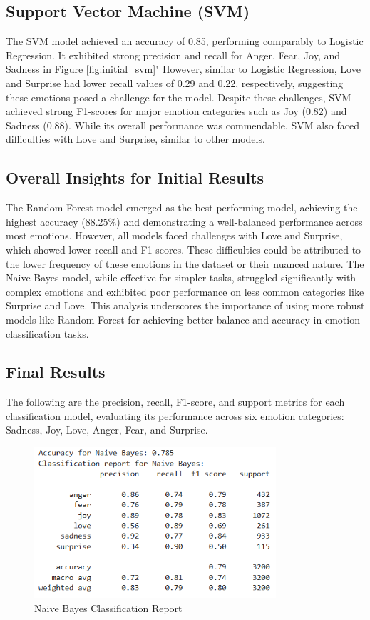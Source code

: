\subsection{Support Vector Machine (SVM)}
The SVM model achieved an accuracy of 0.85, performing comparably to Logistic Regression. It exhibited strong precision and recall for Anger, Fear, Joy, and Sadness in Figure \ref{fig:initial_svm}" However, similar to Logistic Regression, Love and Surprise had lower recall values of 0.29 and 0.22, respectively, suggesting these emotions posed a challenge for the model. Despite these challenges, SVM achieved strong F1-scores for major emotion categories such as Joy (0.82) and Sadness (0.88). While its overall performance was commendable, SVM also faced difficulties with Love and Surprise, similar to other models.

\subsection{Overall Insights for Initial Results}
The Random Forest model emerged as the best-performing model, achieving the highest accuracy (88.25\%) and demonstrating a well-balanced performance across most emotions. However, all models faced challenges with Love and Surprise, which showed lower recall and F1-scores. These difficulties could be attributed to the lower frequency of these emotions in the dataset or their nuanced nature. The Naive Bayes model, while effective for simpler tasks, struggled significantly with complex emotions and exhibited poor performance on less common categories like Surprise and Love. This analysis underscores the importance of using more robust models like Random Forest for achieving better balance and accuracy in emotion classification tasks.

       
\subsection{Final Results}
The following are the precision, recall, F1-score, and support metrics for each classification model, evaluating its performance across six emotion categories: Sadness, Joy, Love, Anger, Fear, and Surprise.

\begin{figure}[h!]
\centering
\includegraphics[width=0.8\textwidth]{images/naive_bayes_result.png}
\caption{Naive Bayes Classification Report}
\label{fig:naive_bayes}
\end{figure}

